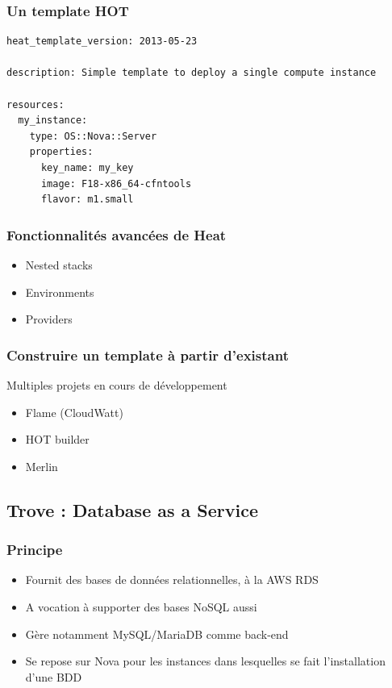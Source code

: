   \begin{frame}[containsverbatim]
    \frametitle{Un template HOT}
\begin{verbatim}
heat_template_version: 2013-05-23

description: Simple template to deploy a single compute instance

resources:
  my_instance:
    type: OS::Nova::Server
    properties:
      key_name: my_key
      image: F18-x86_64-cfntools
      flavor: m1.small
\end{verbatim}
  \end{frame}

  \begin{frame}
    \frametitle{Fonctionnalités avancées de Heat}
    \begin{itemize}
      \item Nested stacks
      \item Environments
      \item Providers
    \end{itemize}
  \end{frame}

  \begin{frame}
    \frametitle{Construire un template à partir d'existant}
    Multiples projets en cours de développement
    \begin{itemize}
      \item Flame (CloudWatt)
      \item HOT builder
      \item Merlin
    \end{itemize}
  \end{frame}

  \subsection[Trove]{Trove : Database as a Service}

  \begin{frame}
    \frametitle{Principe}
    \begin{itemize}
      \item Fournit des bases de données relationnelles, à la AWS RDS
      \item A vocation à supporter des bases NoSQL aussi
      \item Gère notamment MySQL/MariaDB comme back-end
      \item Se repose sur Nova pour les instances dans lesquelles se fait l'installation d'une BDD
    \end{itemize}
  \end{frame}

